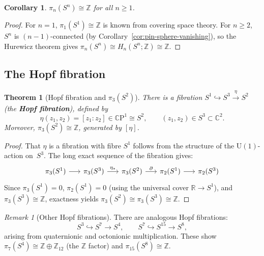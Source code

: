 \documentclass[12pt,a4paper,openany]{book}
\theoremstyle{definition}
\theoremstyle{plain}
\newtheorem{theorem}[definition]{Theorem}
\newtheorem{corollary}[definition]{Corollary}
\theoremstyle{remark}
\newtheorem{remark}[definition]{Remark}
\newcommand{\Z}{\mathbb{Z}}
\newcommand{\R}{\mathbb{R}}
\newcommand{\C}{\mathbb{C}}
\newcommand{\CP}{\mathbb{C}\mathrm{P}}
\begin{document}
\begin{corollary}\label{cor:pin-sn}
\index{sphere!$\pi_n(S^n)\cong\Z$}
$\pi_n(S^n)\cong\Z$ for all $n\ge1$.
\end{corollary}

\begin{proof}
For $n=1$, $\pi_1(S^1)\cong\Z$ is known from covering space theory.
For $n\ge2$, $S^n$ is $(n{-}1)$-connected (by
Corollary~\ref{cor:pin-sphere-vanishing}), so the Hurewicz theorem
gives $\pi_n(S^n)\cong H_n(S^n;\Z)\cong\Z$.
\end{proof}

\subsection{The Hopf fibration}

\begin{theorem}[Hopf fibration and $\pi_3(S^2)$]
\label{thm:hopf}
There is a fibration $S^1\hookrightarrow S^3\xrightarrow{\eta}S^2$
(the \textbf{Hopf fibration}), defined by
\[
  \eta(z_1,z_2)=[z_1:z_2]\in\CP^1\cong S^2,
  \qquad (z_1,z_2)\in S^3\subset\C^2.
\]
Moreover, $\pi_3(S^2)\cong\Z$, generated by $[\eta]$.
\end{theorem}

\begin{proof}
That $\eta$ is a fibration with fibre $S^1$ follows from the
structure of the $\mathrm{U}(1)$-action on~$S^3$.  The long exact
sequence of the fibration gives:
\[
\begin{tikzcd}[column sep=1.6em]
  \pi_3(S^1) \ar[r]
  & \pi_3(S^3) \ar[r,"\eta_*"]
  & \pi_3(S^2) \ar[r,"\partial"]
  & \pi_2(S^1) \ar[r]
  & \pi_2(S^3)
\end{tikzcd}
\]
Since $\pi_3(S^1)=0$, $\pi_2(S^1)=0$ (using the universal cover
$\R\to S^1$), and $\pi_3(S^3)\cong\Z$, exactness yields
$\pi_3(S^2)\cong\pi_3(S^3)\cong\Z$.
\end{proof}

\begin{remark}[Other Hopf fibrations]
There are analogous Hopf fibrations:
\[
  S^3\hookrightarrow S^7\to S^4,
  \qquad
  S^7\hookrightarrow S^{15}\to S^8,
\]
arising from quaternionic and octonionic multiplication.  These show
$\pi_7(S^4)\cong\Z\oplus\Z_{12}$ (the $\Z$ factor) and
$\pi_{15}(S^8)\cong\Z$.
\end{remark}
\end{document}
